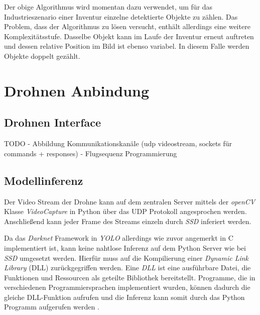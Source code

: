 

Der obige Algorithmus wird momentan dazu verwendet, um für das Industrieszenario einer Inventur einzelne detektierte Objekte zu zählen. Das Problem, dass der Algorithmus zu lösen versucht, enthält allerdings eine weitere Komplexitätsstufe. Dasselbe Objekt kann im Laufe der Inventur erneut auftreten und dessen relative Position im Bild ist ebenso variabel. In diesem Falle werden Objekte doppelt gezählt. 

\section{Drohnen Anbindung}

\subsection*{Drohnen Interface}

TODO
- Abbildung Kommunikationskanäle (udp videostream, sockets für commands + responses)
- Flugsequenz Programmierung

\subsection*{Modellinferenz}

Der Video Stream der Drohne kann auf dem zentralen Server mittels der \textit{openCV} Klasse \textit{VideoCapture} in Python über das UDP Protokoll angesprochen werden. Anschließend kann jeder Frame des Streams einzeln durch \textit{SSD} inferiert werden.

Da das \textit{Darknet} Framework in \textit{YOLO} allerdings wie zuvor angemerkt in C implementiert ist, kann keine nahtlose Inferenz auf dem Python Server wie bei \textit{SSD} umgesetzt werden. Hierfür muss auf die Kompilierung einer \textit{Dynamic Link Library} (DLL) zurückgegriffen werden. Eine \textit{DLL} ist eine ausführbare Datei, die Funktionen und Ressourcen als geteilte Bibliothek bereitstellt. Programme, die in verschiedenen Programmiersprachen implementiert wurden, können dadurch die gleiche DLL-Funktion aufrufen und die Inferenz kann somit durch das Python Programm aufgerufen werden \cite{MicrosoftCorporation.27.01.2020}.
